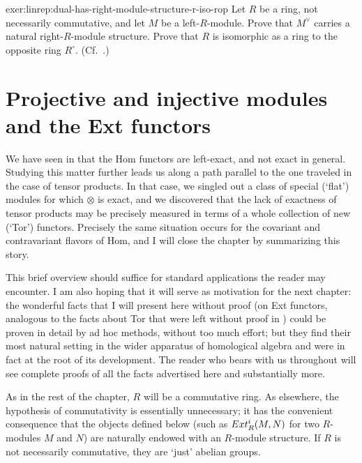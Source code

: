 \begin{exer}{}{exer:linrep:dual-has-right-module-structure-r-iso-rop}
  Let $R$ be a ring, not necessarily commutative, and let $M$ be a
  left-$R$-module. Prove that $M^\vee$ carries a natural
  right-$R$-module structure. Prove that $R$ is isomorphic as a ring
  to the opposite ring $R^\circ$. (Cf.\
  .)
\end{exer}

\section{Projective and injective modules and the Ext functors}
\label{sec:linrep:projective-and-injective-modules-and-the-ext-functors}

We have seen in  that the Hom
functors are left-exact, and not exact in general. Studying this
matter further leads us along a path parallel to the one traveled in
the case of tensor products. In that case, we singled out a class of
special (`flat') modules for which $\otimes$ is exact, and we
discovered that the lack of exactness of tensor products may be
precisely measured in terms of a whole collection of new (`Tor')
functors. Precisely the same situation occurs for the covariant and
contravariant flavors of Hom, and I will close the chapter by
summarizing this story.

This brief overview should suffice for standard applications the
reader may encounter. I am also hoping that it will serve as
motivation for the next chapter: the wonderful facts that I will
present here without proof (on Ext functors, analogous to the facts
about Tor that were left without proof in
) could be proven in detail by
ad hoc methods, without too much effort; but they find their most
natural setting in the wider apparatus of homological algebra and were
in fact at the root of its development. The reader who bears with us
throughout \Cref{chap:homol} will see complete proofs of all the facts
advertised here and substantially more.

As in the rest of the chapter, $R$ will be a commutative ring. As
elsewhere, the hypothesis of commutativity is essentially unnecessary;
it has the convenient consequence that the objects defined below (such
as $Ext^i_R(M, N)$ for two $R$-modules $M$ and $N$) are naturally
endowed with an $R$-module structure. If $R$ is not necessarily
commutative, they are `just' abelian groups.

